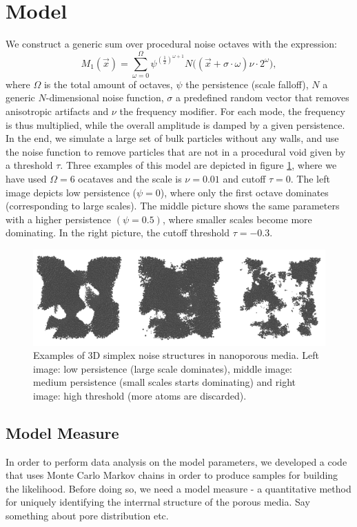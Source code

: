 \documentclass[aps,pre,twocolumn,letterpaper,floatfix,showpacs]{revtex4}
\begin{document}
\section{Model}
We construct a generic sum over procedural noise octaves with the expression: 
\begin{equation}
  M_1(\vec x) = \sum_{\omega=0}^{\Omega} \psi^{(\frac{1}{2})^{\omega +1}}   N\big((\vec x + \sigma \cdot \omega)\nu \cdot 2^\omega \big),
\label{eq:noisemodel1}
\end{equation}
where $\Omega$ is the total amount of octaves, $\psi$ the persistence (scale falloff), $N$ a generic $N$-dimensional noise function, $\sigma$ a predefined random vector that removes anisotropic artifacts and $\nu$ the frequency modifier. For each mode, the frequency is thus multiplied, while the overall amplitude is damped by a given persistence. In the end, we simulate a large set of bulk particles without any walls, and use the noise function to remove particles that are not in a procedural void given by a threshold $\tau$. Three examples of this model are depicted in figure \ref{fig:model_example}, where we have used $\Omega=6$ ocataves and the scale is $\nu=0.01$ and cutoff $\tau=0$. The left image depicts low persistence ($\psi = 0$), where only the first octave dominates (corresponding to large scales). The middle picture shows the same parameters with a higher persistence $(\psi = 0.5)$, where smaller scales become more dominating. In the right picture, the cutoff threshold $\tau = -0.3$.   

\begin{figure}
\includegraphics[width=.95\textwidth]{model_examples.png}
\caption{Examples of 3D simplex noise structures in nanoporous media. Left image: low persistence (large scale dominates), middle image: medium persistence (small scales starts dominating) and right image: high threshold (more atoms are discarded). }
\label{fig:model_example}
\end{figure}



\subsection{Model Measure}
In order to perform data analysis on the model parameters, we developed a code that uses Monte Carlo Markov chains in order to produce samples for building the likelihood. Before doing so, we need a model measure - a quantitative method for uniquely identifying the interrnal structure of the porous media. Say something about pore distribution etc.   
\end{document}
